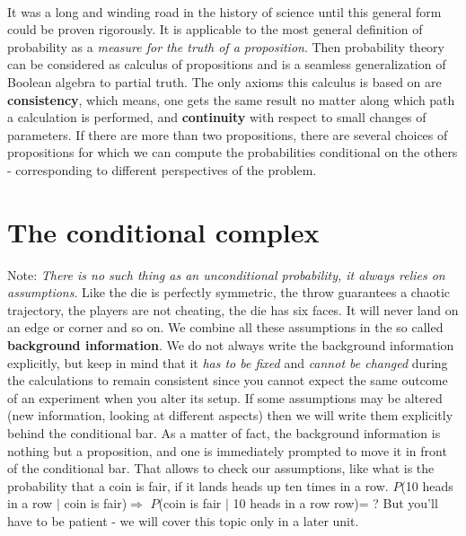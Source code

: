 \documentclass[12pt, a4paper]{scrartcl}
\begin{document}
\\

It was a long and winding road in the history of science until this general form could be proven rigorously.
It is applicable to the most general definition of probability as a \textit{measure for the truth of a proposition}.
Then probability theory can be considered as calculus of propositions and is a seamless generalization of Boolean algebra to partial truth.
The only axioms this calculus is based on are  \textbf{consistency}, which means, one gets the same result no matter along which path a calculation is performed, and  \textbf{continuity} with respect to small changes of parameters.
If there are more than two propositions, there are several choices of propositions for which we can compute the probabilities conditional on the others - corresponding to different perspectives of the problem.\\

\section*{The conditional complex}
Note: \textit{There is no such thing as an unconditional probability, it always relies on assumptions}.
Like the die is perfectly symmetric, the throw guarantees a chaotic trajectory, the players are not cheating, the die has six faces. It will never land on an edge or corner and so on.
We combine all these assumptions in the so called  \textbf{background information}.
We do not always write the background information explicitly, but keep in mind that it \textit{has to be fixed} and \textit{cannot be changed} during the calculations to remain consistent since you cannot expect the same outcome of an experiment when you alter its setup.
If some assumptions may be altered (new information, looking at different aspects) then we will write them explicitly behind the conditional bar. 
As a matter of fact, the background information is nothing but a proposition, and one is immediately prompted to move it in front of the conditional bar. 
That allows to check our assumptions, like what is the probability that a coin is fair, if it lands heads up ten times in a row. $P$(10 heads in a row $|$ coin is  fair)$ \Rightarrow$ $P$(coin is fair $|$ 10 heads in a row row)= ?
But you'll have to be patient - we will cover this topic only in a later unit.\\
\end{document}
